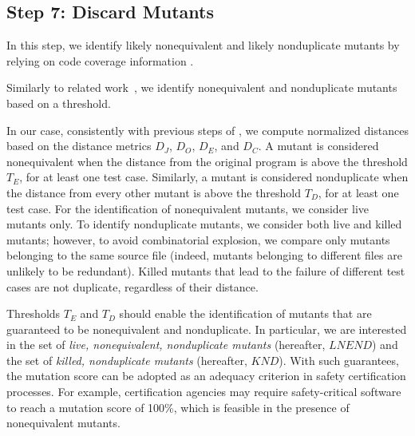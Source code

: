 %
%
%
%
%

\subsection{Step 7: Discard Mutants}
\label{sec:algostepSeven}


In this step, we identify likely nonequivalent and likely nonduplicate mutants by relying on code coverage information .

Similarly to related work~\cite{schuler2013covering}, 
we identify nonequivalent and nonduplicate mutants based on a threshold.

In our case, consistently with previous steps of \APPR,
we compute normalized distances based on the distance metrics $D_J$, $D_O$, $D_E$, and $D_C$. A mutant is considered nonequivalent when the distance from the original program is above the threshold $T_E$, for at least one test case.
Similarly, a mutant is considered nonduplicate when the distance from every other mutant is above the threshold $T_D$, for at least one test case. For the identification of nonequivalent mutants, we consider live mutants only. To identify nonduplicate mutants, we consider both live and killed mutants; however, to avoid combinatorial explosion, we compare only mutants belonging to the same source file (indeed, mutants belonging to different files are unlikely to be redundant). 
Killed mutants that lead to the failure of different test cases are not duplicate, regardless of their distance.

Thresholds $T_E$ and $T_D$ should enable the identification of mutants that are guaranteed to be nonequivalent and nonduplicate. In particular, we are interested in the set of \emph{live, nonequivalent, nonduplicate mutants} (hereafter, $\mathit{LNEND}$) and the set of \emph{killed, nonduplicate mutants} (hereafter, $\mathit{KND}$). With such guarantees, the mutation score can be adopted as an adequacy criterion in safety certification processes. For example, certification agencies may require safety-critical software to reach a mutation score of 100\%, which is feasible in the presence of nonequivalent mutants. 

